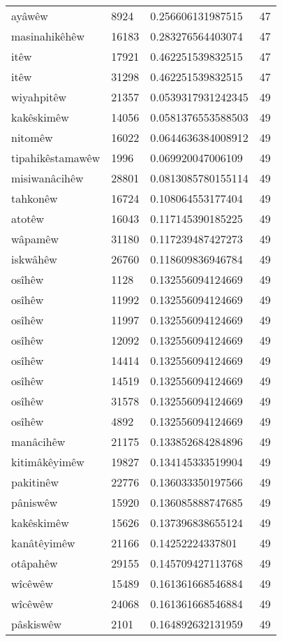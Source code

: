 \begin{longtable}{llll}
ayâwêw & 8924 & 0.256606131987515 & 47\\
masinahikêhêw & 16183 & 0.283276564403074 & 47\\
itêw & 17921 & 0.462251539832515 & 47\\
itêw & 31298 & 0.462251539832515 & 47\\
wiyahpitêw & 21357 & 0.0539317931242345 & 49\\
kakêskimêw & 14056 & 0.0581376553588503 & 49\\
nitomêw & 16022 & 0.0644636384008912 & 49\\
tipahikêstamawêw & 1996 & 0.069920047006109 & 49\\
misiwanâcihêw & 28801 & 0.0813085780155114 & 49\\
tahkonêw & 16724 & 0.108064553177404 & 49\\
atotêw & 16043 & 0.117145390185225 & 49\\
wâpamêw & 31180 & 0.117239487427273 & 49\\
iskwâhêw & 26760 & 0.118609836946784 & 49\\
osîhêw & 1128 & 0.132556094124669 & 49\\
osîhêw & 11992 & 0.132556094124669 & 49\\
osîhêw & 11997 & 0.132556094124669 & 49\\
osîhêw & 12092 & 0.132556094124669 & 49\\
osîhêw & 14414 & 0.132556094124669 & 49\\
osîhêw & 14519 & 0.132556094124669 & 49\\
osîhêw & 31578 & 0.132556094124669 & 49\\
osîhêw & 4892 & 0.132556094124669 & 49\\
manâcihêw & 21175 & 0.133852684284896 & 49\\
kitimâkêyimêw & 19827 & 0.134145333519904 & 49\\
pakitinêw & 22776 & 0.136033350197566 & 49\\
pâniswêw & 15920 & 0.136085888747685 & 49\\
kakêskimêw & 15626 & 0.137396838655124 & 49\\
kanâtêyimêw & 21166 & 0.14252224337801 & 49\\
otâpahêw & 29155 & 0.145709427113768 & 49\\
wîcêwêw & 15489 & 0.161361668546884 & 49\\
wîcêwêw & 24068 & 0.161361668546884 & 49\\
pâskiswêw & 2101 & 0.164892632131959 & 49\\

\end{longtable}
